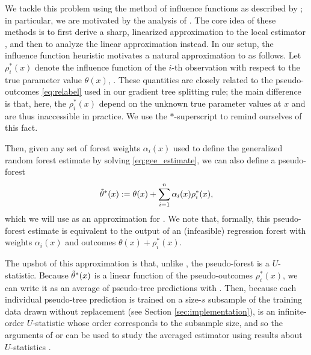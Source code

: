 \documentclass[aos]{imsart}
\theoremstyle{plain}
\theoremstyle{definition}
\theoremstyle{remark}
\begin{document}
\begin{CJK}{UTF8}{gbsn}
{We tackle this problem using the method of influence functions as described by \citet{hampel1974influence};
in particular, we are motivated by the analysis of \citet{newey1994kernel}. The core idea of these methods
is to first derive a sharp, linearized approximation to the local estimator , and
then to analyze the linear approximation instead.
In our setup, the influence function heuristic motivates a natural approximation 
to  as follows. Let $\rho_i^*(x)$ denote the influence function of the
$i$-th observation with respect to the true parameter value $\theta(x)$,
.
These quantities are closely related to the pseudo-outcomes \eqref{eq:relabel} used in our gradient tree
splitting rule; the main difference is that, here, the $\rho_i^*(x)$ depend on the unknown true
parameter values at $x$ and are thus inaccessible in practice. We use the $*$-superscript to remind ourselves
of this fact.

Then, given any set of forest weights $\alpha_i(x)$ used to define the generalized random forest
estimate  by solving \eqref{eq:gee_estimate}, we can also define a
pseudo-forest
\begin{equation}
\label{eq:pseudo_forest}
\ttheta^*(x) := \theta(x) + \sum_{i = 1}^n \alpha_i(x) \rho_i^*(x),
\end{equation}
which we will use as an approximation for  . We note that,
formally, this pseudo-forest estimate  is equivalent to the output of an (infeasible)
regression forest with weights $\alpha_i(x)$ and outcomes $\theta(x) + \rho_i^*(x)$.

The upshot of this approximation is that, unlike , the pseudo-forest
 is a $U$-statistic.
Because $\tilde{\theta}^*(x)$ is a linear function of the pseudo-outcomes $\rho_i^*(x)$,
we can write it as an average of pseudo-tree predictions
 with
.
Then, because each individual pseudo-tree prediction  is trained on a size-$s$ subsample
of the training data drawn without replacement (see Section \ref{sec:implementation}), 
 is an infinite-order $U$-statistic whose order corresponds to the subsample size,
and so the arguments of \citet{mentch2016quantifying} or \citet{wager2015estimation} can be used to study the averaged estimator
 using results about $U$-statistics \citep{hoeffding1948class,efron1981jackknife}.

}
\end{CJK}
\end{document}

